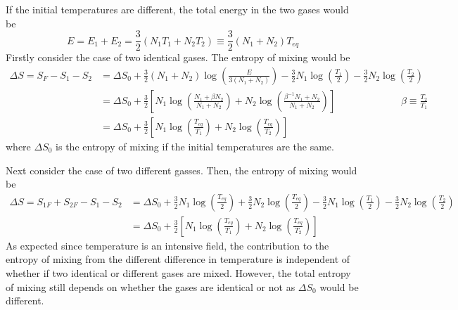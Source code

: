 \documentclass{article}
\newcommand{\bigspace}{\:\:\:\:\:\:\:\:\:\:\:\:\:\:\:\:\:\:\:\:\:\:\:\:\:\:\:\:\:\:}
\begin{document}
\begin{sol}[1.13]
    If the initial temperatures are different, the total energy in the two gases would be 
    \begin{equation}
        E=E_1+E_2=\frac{3}{2}(N_1T_1+N_2T_2)\equiv\frac{3}{2}(N_1+N_2)T_{eq}
    \end{equation}
    Firstly consider the case of two identical gases. The entropy of mixing would be
    \begin{align}
        \Delta S=S_F-S_1-S_2&=\Delta S_0+\frac{3}{2}(N_1+N_2)\log\left(\frac{E}{3(N_1+N_2)}\right)-\frac{3}{2}N_1\log\left(\frac{T_1}{2}\right)-\frac{3}{2}N_2\log\left(\frac{T_2}{2}\right)\\
        &=\Delta S_0+\frac{3}{2}\left[N_1\log\left(\frac{N_1+\beta N_2}{N_1+N_2}\right)+N_2\log\left(\frac{\beta^{-1}N_1+N_2}{N_1+N_2}\right)\right]\bigspace \beta\equiv\frac{T_2}{T_1}\\
        &=\Delta S_0+\frac{3}{2}\left[N_1\log\left(\frac{T_{eq}}{T_1}\right)+N_2\log\left(\frac{T_{eq}}{T_2}\right)\right]
    \end{align}
    where $\Delta S_0$ is the entropy of mixing if the initial temperatures are the same. 

    Next consider the case of two different gasses. Then, the entropy of mixing would be 
    \begin{align}
        \Delta S=S_{1F}+S_{2F}-S_{1}-S_2&=\Delta S_0+\frac{3}{2}N_1\log\left(\frac{T_{eq}}{2}\right)+\frac{3}{2}N_2\log\left(\frac{T_{eq}}{2}\right)-\frac{3}{2}N_1\log\left(\frac{T_{1}}{2}\right)-\frac{3}{2}N_2\log\left(\frac{T_{2}}{2}\right)\\
        &=\Delta S_0+\frac{3}{2}\left[N_1\log\left(\frac{T_{eq}}{T_1}\right)+N_2\log\left(\frac{T_{eq}}{T_2}\right)\right]
    \end{align}
    As expected since temperature is an intensive field, the contribution to the entropy of mixing from the different difference in temperature is independent of whether if two identical or different gases are mixed. However, the total entropy of mixing still depends on whether the gases are identical or not as $\Delta S_0$ would be different. 
\end{sol}
\end{document}
